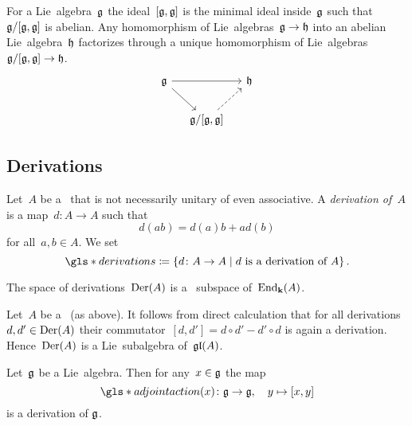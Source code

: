 \begin{remark}
  For a Lie~algebra~$\mathfrak{g}$ the ideal~$[\mathfrak{g},\mathfrak{g}]$ is the minimal ideal inside~$\mathfrak{g}$ such that~$\mathfrak{g}/[\mathfrak{g},\mathfrak{g}]$ is abelian.
  Any homomorphism of Lie~algebras~$\mathfrak{g} \to \mathfrak{h}$ into an abelian Lie~algebra~$\mathfrak{h}$ factorizes through a unique homomorphism of Lie~algebras~$\mathfrak{g}/[\mathfrak{g}, \mathfrak{g}] \to \mathfrak{h}$.
  \[
    \begin{tikzcd}[column sep = small]
      \glie
      \arrow{rr}
      \arrow{dr}
      &
      {}
      &
      \hlie
      \\
      {}
      &
      \glie/[\glie,\glie]
      \arrow[dashed]{ur}
      &
      {}
    \end{tikzcd}
  \]
\end{remark}





\subsection{Derivations}


\begin{definition}
  Let~$A$ be a~{\algebra{$\kf$}} that is not necessarily unitary of even associative.
  A \emph{derivation of~$A$} is a {\linear{$\kf$}} map~$d \colon A \to A$ such that
  \[
    d(ab)
    =
    d(a)b + ad(b)
  \]
  for all~$a, b \in A$.
  We set
  \[
    \gls*{derivations}
    \defined
    \{
      d
      \colon
      A
      \to
      A
    \suchthat
      \text{$d$ is a derivation of~$A$}
    \}  \,.
  \]
\end{definition}


\begin{remark}
  The space of derivations~$\operatorname{Der}(A)$ is a~{\linear{$\kf$}} subspace of~$\operatorname{End}_{\mathbf{k}}(A)$.
\end{remark}


\begin{example}
  Let~$A$ be a~{\algebra{$\kf$}} (as above).
  It follows from direct calculation that for all derivations~$d, d' \in \operatorname{Der}(A)$ their commutator~$[d,d'] = d \circ d' - d' \circ d$ is again a derivation.
  Hence~$\operatorname{Der}(A)$ is a Lie~subalgebra of~$\mathfrak{gl}(A)$.
\end{example}


\begin{lemma}
\label{lie algebras act adjoint by derivations}
  Let~$\mathfrak{g}$ be a Lie~algebra.
  Then for any~$x \in \mathfrak{g}$ the map
  \[
    \gls*{adjoint action}(x)
    \colon
    \glie
    \to
    \glie,
    \quad
    y
    \mapsto
    [x,y]
  \]
  is a derivation of $\mathfrak{g}$.
\end{lemma}


